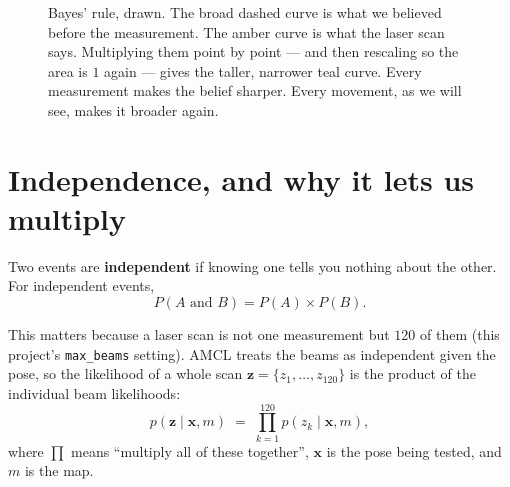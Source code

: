 \documentclass[11pt,a4paper]{report}
\newcommand{\term}[1]{\textcolor{rust}{\textbf{#1}}}
\newcommand{\file}[1]{\texttt{\small #1}}
\newcommand{\xt}{\mathbf{x}}
\begin{document}
\begin{figure}[htbp]
\centering
{}
\caption[Bayes' rule as a picture]{Bayes' rule, drawn. The broad dashed curve is
what we believed before the measurement. The amber curve is what the laser scan
says. Multiplying them point by point --- and then rescaling so the area is
$1$ again --- gives the taller, narrower teal curve. Every measurement makes
the belief sharper. Every movement, as we will see, makes it broader again.}
\label{fig:bayes}
\end{figure}

\section{Independence, and why it lets us multiply}

Two events are \term{independent} if knowing one tells you nothing about the
other. For independent events,
\[
P(A \text{ and } B) = P(A) \times P(B) .
\]

This matters because a laser scan is not one measurement but $120$ of them
(this project's \file{max\_beams} setting). AMCL treats the beams as
independent given the pose, so the likelihood of a whole scan
$\mathbf{z} = \{z_1,\ldots,z_{120}\}$ is the product of the individual beam
likelihoods:
\begin{equation}
p(\mathbf{z} \mid \xt, m) \;=\; \prod_{k=1}^{120} p(z_k \mid \xt, m),
\label{eq:beamproduct}
\end{equation}
where $\prod$ means ``multiply all of these together'', $\xt$ is the pose being
tested, and $m$ is the map.
\end{document}
